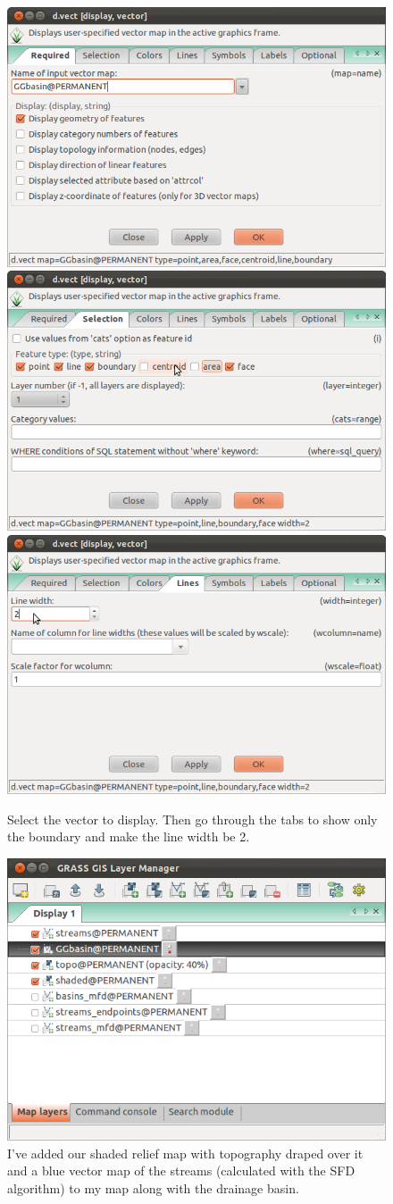 \documentclass{book}
\begin{document}
\begin{figure}[!h]
 \begin{center}
 \includegraphics[width=.45\linewidth]{figures/ubuntu/selectVector.png}
 \includegraphics[width=.45\linewidth]{figures/ubuntu/deselectCentroidArea.png}\\
 \vspace{2mm}
 \includegraphics[width=.45\linewidth]{figures/ubuntu/linewidth2.png}
 \caption{Select the vector to display. Then go through the tabs to show only the boundary and make the line width be 2.}
 \label{fig:dispVector}
 \end{center}
\end{figure}

\begin{figure}[!h]
 \begin{center}
 \includegraphics[width=.7\linewidth]{figures/ubuntu/hydroPlot.png}
 \caption{I've added our shaded relief map with topography draped over it and a blue vector map of the streams (calculated with the SFD algorithm) to my map along with the drainage basin.}
 \label{fig:hydroPlot}
 \end{center}
\end{figure}
\end{document}
